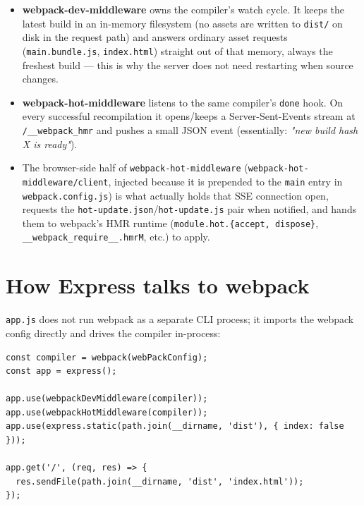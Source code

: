 \documentclass{article}
\begin{document}
\begin{itemize}
  \item \textbf{webpack-dev-middleware} owns the compiler's watch cycle. It
    keeps the latest build in an in-memory filesystem (no assets are written
    to \texttt{dist/} on disk in the request path) and answers ordinary
    asset requests (\texttt{main.bundle.js}, \texttt{index.html}) straight
    out of that memory, always the freshest build --- this is why the
    server does not need restarting when source changes.
  \item \textbf{webpack-hot-middleware} listens to the same compiler's
    \texttt{done} hook. On every successful recompilation it opens/keeps a
    Server-Sent-Events stream at \texttt{/\_\_webpack\_hmr} and pushes a
    small JSON event (essentially: \emph{"new build hash X is ready"}).
  \item The browser-side half of \texttt{webpack-hot-middleware}
    (\texttt{webpack-hot-middleware/client}, injected because it is
    prepended to the \texttt{main} entry in \texttt{webpack.config.js}) is
    what actually holds that SSE connection open, requests the
    \texttt{hot-update.json}/\texttt{hot-update.js} pair when notified, and
    hands them to webpack's HMR runtime (\texttt{module.hot.\{accept,
    dispose\}}, \texttt{\_\_webpack\_require\_\_.hmrM}, etc.) to apply.
\end{itemize}

\section{How Express talks to webpack}

\texttt{app.js} does not run webpack as a separate CLI process; it imports
the webpack config directly and drives the compiler in-process:

\begin{lstlisting}[style=js]
const compiler = webpack(webPackConfig);
const app = express();

app.use(webpackDevMiddleware(compiler));
app.use(webpackHotMiddleware(compiler));
app.use(express.static(path.join(__dirname, 'dist'), { index: false }));

app.get('/', (req, res) => {
  res.sendFile(path.join(__dirname, 'dist', 'index.html'));
});
\end{lstlisting}
\end{document}

